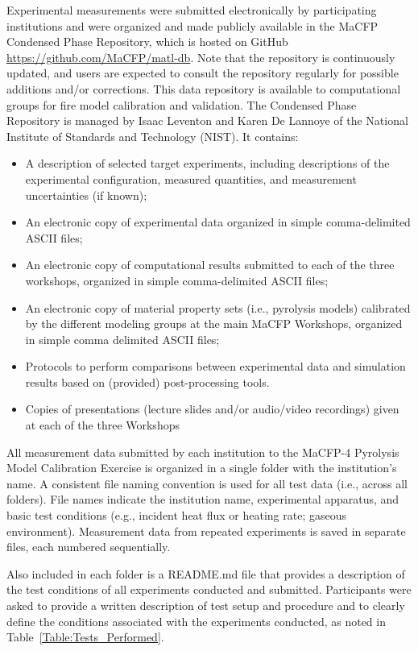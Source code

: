 \documentclass{book}
\begin{document}
Experimental measurements were submitted electronically by participating institutions and were organized and made publicly available in the MaCFP Condensed Phase Repository, which is hosted on GitHub \url{https://github.com/MaCFP/matl-db}. Note that the repository is continuously updated, and users are expected to consult the repository regularly for possible additions and/or corrections. This data repository is available to computational groups for fire model calibration and validation. The Condensed Phase Repository is managed by Isaac Leventon and Karen De Lannoye of the National Institute of Standards and Technology (NIST). It contains:
\begin{itemize} [noitemsep]
\item A description of selected target experiments, including descriptions of the experimental configuration, measured quantities, and measurement uncertainties (if known);
\item An electronic copy of experimental data organized in simple comma-delimited ASCII files;
\item  An electronic copy of computational results submitted to each of the three workshops, organized in simple comma-delimited ASCII files;
 \item An electronic copy of material property sets (i.e., pyrolysis models) calibrated by the different modeling groups at the main MaCFP Workshops, organized in simple comma delimited ASCII files;
\item Protocols to perform comparisons between experimental data and simulation results based on (provided) post-processing tools.
\item Copies of presentations (lecture slides and/or audio/video recordings) given at each of the three Workshops
\end{itemize}

All measurement data submitted by each institution to the MaCFP-4 Pyrolysis Model Calibration Exercise is organized in a single folder with the institution’s name. A consistent file naming convention is used for all test data (i.e., across all folders). File names indicate the institution name, experimental apparatus, and basic test conditions (e.g., incident heat flux or heating rate; gaseous environment). Measurement data from repeated experiments is saved in separate files, each numbered sequentially.

Also included in each folder is a README.md file that provides a description of the test conditions of all experiments conducted and submitted. Participants were asked to provide a written description of test setup and procedure and to clearly define the conditions associated with the experiments conducted, as noted in Table~\ref{Table:Tests_Performed}.
\end{document}
